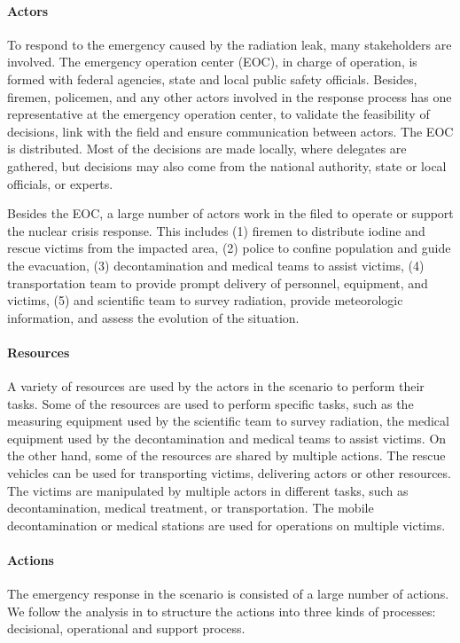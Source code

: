 \paragraph*{Actors} %
\label{par:actors}
To respond to the emergency caused by the radiation leak, many stakeholders are involved. The emergency operation center (EOC), in charge of operation, is formed with federal agencies, state and local public safety officials. Besides, firemen, policemen, and any other actors involved in the response process has one representative at the emergency operation center, to validate the feasibility of decisions, link with the field and ensure communication between actors. The EOC is distributed. Most of the decisions are made locally, where delegates are gathered, but decisions may also come from the national authority, state or local officials, or experts.

Besides the EOC, a large number of actors work in the filed to operate or support the nuclear crisis response. This includes (1) firemen to distribute iodine and rescue victims from the impacted area, (2) police to confine population and guide the evacuation, (3) decontamination and medical teams to assist victims, (4) transportation team to provide prompt delivery of personnel, equipment, and victims, (5) and scientific team to survey radiation, provide meteorologic information, and assess the evolution of the situation.

\paragraph*{Resources} %
\label{par:resources}
A variety of resources are used by the actors in the scenario to perform their tasks. Some of the resources are used to perform specific tasks, such as the measuring equipment used by the scientific team to survey radiation, the medical equipment used by the decontamination and medical teams to assist victims. On the other hand, some of the resources are shared by multiple actions. The rescue vehicles can be used for transporting victims, delivering actors or other resources. The victims are manipulated by multiple actors in different tasks, such as decontamination, medical treatment, or transportation. The mobile decontamination or medical stations are used for operations on multiple victims. 

\paragraph*{Actions} %
\label{par:actions}
The emergency response in the scenario is consisted of a large number of actions. We follow the analysis in \cite{Truptil2012} to structure the actions into three kinds of processes: decisional, operational and support process.

